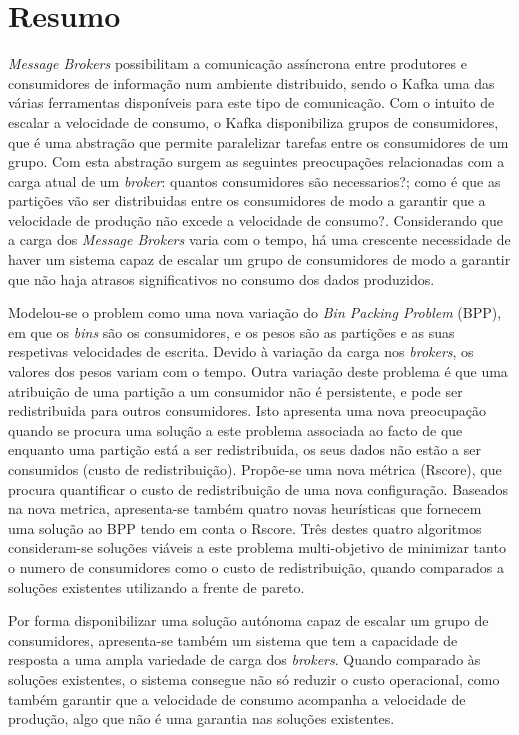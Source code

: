 \chapter*{Resumo}

\textit{Message Brokers} possibilitam a comunicação assíncrona entre produtores
e consumidores de informação num ambiente distribuido, sendo o Kafka uma das
várias ferramentas disponíveis para este tipo de comunicação. Com o intuito de
escalar a velocidade de consumo, o Kafka disponibiliza grupos de consumidores,
que é uma abstração que permite paralelizar tarefas entre os consumidores de um
grupo. Com esta abstração surgem as seguintes preocupações relacionadas com a
carga atual de um \textit{broker}: quantos consumidores são necessarios?; como é
que as partições vão ser distribuidas entre os consumidores de modo a garantir
que a velocidade de produção não excede a velocidade de consumo?. Considerando
que a carga dos \textit{Message Brokers} varia com o tempo, há uma crescente
necessidade de haver um sistema capaz de escalar um grupo de consumidores de
modo a garantir que não haja atrasos significativos no consumo dos dados
produzidos.

Modelou-se o problem como uma nova variação do \textit{Bin Packing Problem} (BPP), em
que os \textit{bins} são os consumidores, e os pesos são as partições e as suas
respetivas velocidades de escrita. Devido à variação da carga nos
\textit{brokers}, os valores dos pesos variam com o tempo. Outra variação deste
problema é que uma atribuição de uma partição a um consumidor não é persistente,
e pode ser redistribuida para outros consumidores. Isto apresenta uma nova
preocupação quando se procura uma solução a este problema associada ao facto de
que enquanto uma partição está a ser redistribuida, os seus dados não estão a
ser consumidos (custo de redistribuição). Propõe-se uma nova métrica (Rscore),
que procura quantificar o custo de redistribuição de uma nova configuração.
Baseados na nova metrica, apresenta-se também quatro novas heurísticas que
fornecem uma solução ao BPP tendo em conta o Rscore. Três destes quatro
algoritmos consideram-se soluções viáveis a este problema multi-objetivo de
minimizar tanto o numero de consumidores como o custo de redistribuição, quando
comparados a soluções existentes utilizando a frente de pareto.

Por forma disponibilizar uma solução autónoma capaz de escalar um grupo de
consumidores, apresenta-se também um sistema que tem a capacidade de resposta a
uma ampla variedade de carga dos \textit{brokers}. Quando comparado às soluções
existentes, o sistema consegue não só reduzir o custo operacional, como também
garantir que a velocidade de consumo acompanha a velocidade de produção, algo
que não é uma garantia nas soluções existentes.
